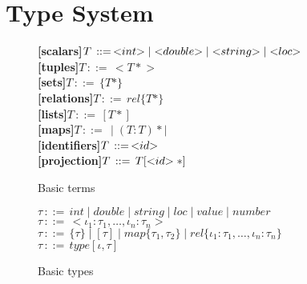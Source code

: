 \documentclass{article}
\begin{document}
\section{Type System}
\label{sec:typeSystem}


\newcommand{\ifthenRule}[2]{\underline{#1}\\ #2\\}

\newcommand{\typeRule}[2]{
  \refstepcounter{rule}
  \ifthenRule{#1}{#2}\\
}
\newcommand{\subTypeRule}[2]{
  \refstepcounter{subtyperule}
  $#1 \leq #2$\\ \\
}
\newcommand{\iffTypeRule}[2]{
  \refstepcounter{subtyperule}
  $#1 \Leftrightarrow #2$\\ \\
}
\newcommand{\eqTypeRule}[2]{
  \refstepcounter{subtyperule}
  $#1\: \equiv\: #2$\\ \\
}
\newcommand{\judgment}[1]{$\Gamma \models #1$}
\newcommand{\hasType}[2]{#1\,:\,#2}
\newcommand{\scalar}[1]{<\negthickspace#1\negthickspace>}
\newcommand{\produces}{::=}
\newcommand{\termDef}[2]{{\bfseries[#1]}\;$T\,\produces\,#2$\\}
\newcommand{\typeDef}[1]{$\tau\,\produces\,#1$\\}
\newcommand{\tupleOf}[1]{<\!#1\!>}
\newcommand{\setOf}[1]{\{#1\}}
\newcommand{\relOf}[1]{rel\{#1\}}
\newcommand{\mapOf}[1]{map\{#1\}}
\newcommand{\listOf}[1]{[#1]}
\newcommand{\ident}{<\negthickspace id\negthickspace>}

\begin{figure*}
\termDef{scalars}{\scalar{int} | \scalar{double} | \scalar{string} | \scalar{loc}}
\termDef{tuples}{\tupleOf{T*}}
\termDef{sets}{\setOf{T*}}
\termDef{relations}{\relOf{T*}}
\termDef{lists}{\listOf{T*}}
\termDef{maps}{\mid(T:T)*\mid}
\termDef{identifiers}{\ident}
\termDef{projection}{T[\ident*]}
\caption{Basic terms}
\label{fig:basicTerms}
\end{figure*}

\begin{figure*}
\typeDef{int \mid double \mid string \mid loc \mid value \mid number}
\typeDef{\tupleOf{\iota_1:\tau_1,\ldots,\iota_n:\tau_n}}
\typeDef{\setOf{\tau} \mid \listOf{\tau} \mid \mapOf{\tau_1,\tau_2} \mid \relOf{\iota_1:\tau_1,\ldots,\iota_n:\tau_n}}
\typeDef{type[\iota,\tau]}
\caption{Basic types}
\label{fig:basicTypes}
\end{figure*}
\end{document}
